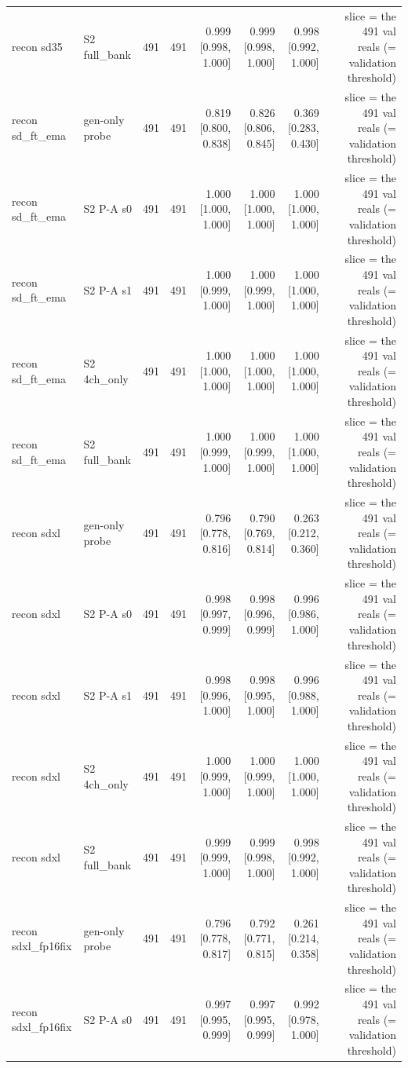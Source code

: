 \begin{table}[htbp]
\begin{tabular}{llrrrrrrr}
recon sd35 & S2 full\_bank & 491 & 491 & 0.999 [0.998, 1.000] & 0.999 [0.998, 1.000] & 0.998 [0.992, 1.000] &  & slice = the 491 val reals (= validation threshold) \\
recon sd\_ft\_ema & gen-only probe & 491 & 491 & 0.819 [0.800, 0.838] & 0.826 [0.806, 0.845] & 0.369 [0.283, 0.430] &  & slice = the 491 val reals (= validation threshold) \\
recon sd\_ft\_ema & S2 P-A s0 & 491 & 491 & 1.000 [1.000, 1.000] & 1.000 [1.000, 1.000] & 1.000 [1.000, 1.000] &  & slice = the 491 val reals (= validation threshold) \\
recon sd\_ft\_ema & S2 P-A s1 & 491 & 491 & 1.000 [0.999, 1.000] & 1.000 [0.999, 1.000] & 1.000 [1.000, 1.000] &  & slice = the 491 val reals (= validation threshold) \\
recon sd\_ft\_ema & S2 4ch\_only & 491 & 491 & 1.000 [1.000, 1.000] & 1.000 [1.000, 1.000] & 1.000 [1.000, 1.000] &  & slice = the 491 val reals (= validation threshold) \\
recon sd\_ft\_ema & S2 full\_bank & 491 & 491 & 1.000 [0.999, 1.000] & 1.000 [0.999, 1.000] & 1.000 [1.000, 1.000] &  & slice = the 491 val reals (= validation threshold) \\
recon sdxl & gen-only probe & 491 & 491 & 0.796 [0.778, 0.816] & 0.790 [0.769, 0.814] & 0.263 [0.212, 0.360] &  & slice = the 491 val reals (= validation threshold) \\
recon sdxl & S2 P-A s0 & 491 & 491 & 0.998 [0.997, 0.999] & 0.998 [0.996, 0.999] & 0.996 [0.986, 1.000] &  & slice = the 491 val reals (= validation threshold) \\
recon sdxl & S2 P-A s1 & 491 & 491 & 0.998 [0.996, 1.000] & 0.998 [0.995, 1.000] & 0.996 [0.988, 1.000] &  & slice = the 491 val reals (= validation threshold) \\
recon sdxl & S2 4ch\_only & 491 & 491 & 1.000 [0.999, 1.000] & 1.000 [0.999, 1.000] & 1.000 [1.000, 1.000] &  & slice = the 491 val reals (= validation threshold) \\
recon sdxl & S2 full\_bank & 491 & 491 & 0.999 [0.999, 1.000] & 0.999 [0.998, 1.000] & 0.998 [0.992, 1.000] &  & slice = the 491 val reals (= validation threshold) \\
recon sdxl\_fp16fix & gen-only probe & 491 & 491 & 0.796 [0.778, 0.817] & 0.792 [0.771, 0.815] & 0.261 [0.214, 0.358] &  & slice = the 491 val reals (= validation threshold) \\
recon sdxl\_fp16fix & S2 P-A s0 & 491 & 491 & 0.997 [0.995, 0.999] & 0.997 [0.995, 0.999] & 0.992 [0.978, 1.000] &  & slice = the 491 val reals (= validation threshold) \\

\end{tabular}
\end{table}
